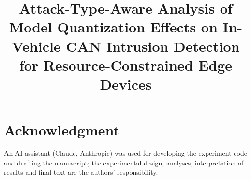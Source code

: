 \documentclass[conference]{IEEEtran}
\begin{document}
\title{Attack-Type-Aware Analysis of Model Quantization Effects on In-Vehicle CAN Intrusion Detection for
Resource-Constrained Edge Devices}

\author{
\and
{}
}

\maketitle












\section*{Acknowledgment}
An AI assistant (Claude, Anthropic) was used for developing the experiment code and drafting the manuscript; the
experimental design, analyses, interpretation of results and final text are the authors' responsibility.




\appendix

\end{document}
